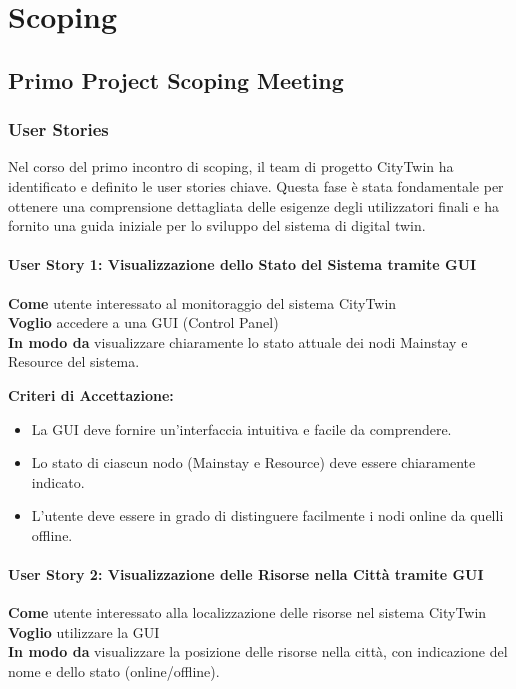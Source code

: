 \chapter{Scoping}

\section{Primo Project Scoping Meeting}

\subsection{User Stories}

Nel corso del primo incontro di scoping, il team di progetto CityTwin ha identificato e definito le user stories chiave. Questa fase è stata fondamentale per ottenere una comprensione dettagliata delle esigenze degli utilizzatori finali e ha fornito una guida iniziale per lo sviluppo del sistema di digital twin.

\subsubsection{User Story 1: Visualizzazione dello Stato del Sistema tramite GUI}

\textbf{Come} utente interessato al monitoraggio del sistema CityTwin \\
\textbf{Voglio} accedere a una GUI (Control Panel) \\
\textbf{In modo da} visualizzare chiaramente lo stato attuale dei nodi Mainstay e Resource del sistema.

\textbf{Criteri di Accettazione:}
\begin{itemize}
  \item La GUI deve fornire un'interfaccia intuitiva e facile da comprendere.
  \item Lo stato di ciascun nodo (Mainstay e Resource) deve essere chiaramente indicato.
  \item L'utente deve essere in grado di distinguere facilmente i nodi online da quelli offline.
\end{itemize}

\subsubsection{User Story 2: Visualizzazione delle Risorse nella Città tramite GUI}

\textbf{Come} utente interessato alla localizzazione delle risorse nel sistema CityTwin \\
\textbf{Voglio} utilizzare la GUI \\
\textbf{In modo da} visualizzare la posizione delle risorse nella città, con indicazione del nome e dello stato (online/offline).

